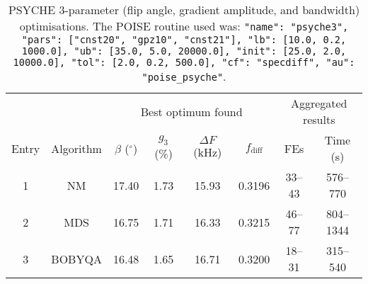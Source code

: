 \begin{table}
    \centering
    \begin{tabular}{cccccccc}
        \toprule
              &           & \multicolumn{4}{c}{Best optimum found} & \multicolumn{2}{c}{Aggregated results} \\
                            \cmidrule(lr){3-6}                     \cmidrule(lr){7-8}
        Entry & Algorithm & $\beta$ ($^\circ$) & $g_3$ (\%) & $\Delta F$ (\unit{\kHz}) & $f_\text{diff}$ & FEs    & Time (\unit{\s}) \\
        \midrule
        1     & NM        & 17.40              & 1.73       & 15.93                  & 0.3196          & 33--43 & 576--770             \\
        2     & MDS       & 16.75              & 1.71       & 16.33                  & 0.3215          & 46--77 & 804--1344            \\
        3     & BOBYQA    & 16.48              & 1.65       & 16.71                  & 0.3200          & 18--31 & 315--540             \\
        \bottomrule
    \end{tabular}
    \caption[PSYCHE 3-parameter optimisations]{
        PSYCHE 3-parameter (flip angle, gradient amplitude, and bandwidth) optimisations.
        The POISE routine used was: \texttt{{"name": "psyche3", "pars": ["cnst20", "gpz10", "cnst21"], "lb": [10.0, 0.2, 1000.0], "ub": [35.0, 5.0, 20000.0], "init": [25.0, 2.0, 10000.0], "tol": [2.0, 0.2, 500.0], "cf": "specdiff", "au": "poise_psyche"}}.
    }
    \label{tbl:poise_psyche3p}
\end{table}

